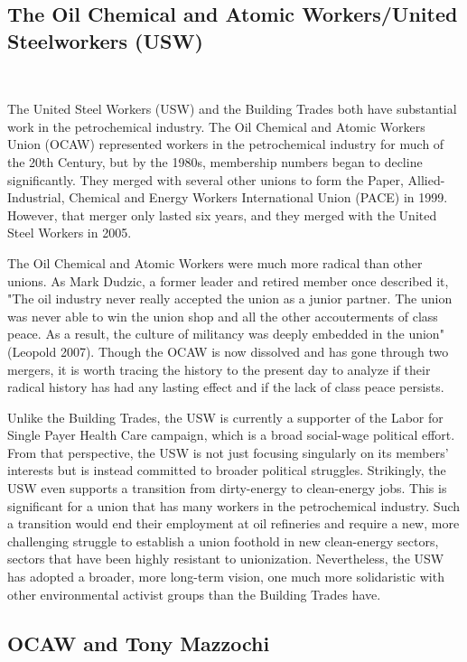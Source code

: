\documentclass[12pt]{article}
\begin{document}

\subsection{The Oil Chemical and Atomic Workers/United Steelworkers (USW)} \

The United Steel Workers (USW) and the Building Trades both have substantial work in the petrochemical industry. The Oil Chemical and Atomic Workers Union (OCAW) represented workers in the petrochemical industry for much of the 20th Century, but by the 1980s, membership numbers began to decline significantly. They merged with several other unions to form the Paper, Allied-Industrial, Chemical and Energy Workers International Union (PACE) in 1999. However, that merger only lasted six years, and they merged with the United Steel Workers in 2005.

The Oil Chemical and Atomic Workers were much more radical than other unions. As Mark Dudzic, a former leader and retired member once described it, "The oil industry never really accepted the union as a junior partner. The union was never able to win the union shop and all the other accouterments of class peace. As a result, the culture of militancy was deeply embedded in the union" (Leopold 2007). Though the OCAW is now dissolved and has gone through two mergers, it is worth tracing the history to the present day to analyze if their radical history has had any lasting effect and if the lack of class peace persists.

Unlike the Building Trades, the USW is currently a supporter of the Labor for Single Payer Health Care campaign, which is a broad social-wage political effort. From that perspective, the USW is not just focusing singularly on its members’ interests but is instead committed to broader political struggles. Strikingly, the USW even supports a transition from dirty-energy to clean-energy jobs. This is significant for a union that has many workers in the petrochemical industry. Such a transition would end their employment at oil refineries and require a new, more challenging struggle to establish a union foothold in new clean-energy sectors, sectors that have been highly resistant to unionization. Nevertheless, the USW has adopted a broader, more long-term vision, one much more solidaristic with other environmental activist groups than the Building Trades have.

\subsection{OCAW and Tony Mazzochi} \
\end{document}
